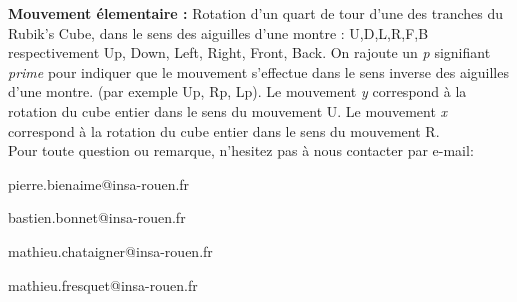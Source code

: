 \documentclass[a4paper,12pt]{article}
\begin{document}
\textbf{Mouvement élementaire :} Rotation d’un quart de tour d’une des tranches du Rubik’s Cube, dans le sens des aiguilles d’une montre : U,D,L,R,F,B
respectivement Up, Down, Left, Right, Front, Back. On rajoute un \textit{p} signifiant \textit{prime} pour indiquer que le mouvement s'effectue dans le sens inverse des aiguilles d'une montre. (par exemple Up, Rp, Lp).
Le mouvement \textit{y} correspond à la rotation du cube entier dans le sens du mouvement U. Le mouvement \textit{x} correspond à la rotation du cube entier dans le sens du mouvement R.\\


Pour toute question ou remarque, n'hesitez pas à nous contacter par e-mail:

pierre.bienaime@insa-rouen.fr

bastien.bonnet@insa-rouen.fr

mathieu.chataigner@insa-rouen.fr

mathieu.fresquet@insa-rouen.fr
\end{document}
